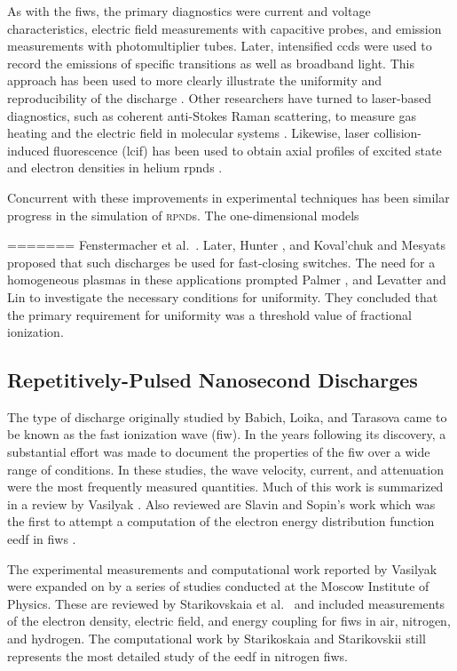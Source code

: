 As with the \acs{fiw}s, the primary diagnostics were current and voltage
characteristics, electric field measurements with capacitive probes, and
emission measurements with photomultiplier tubes. Later, intensified \acs{ccd}s
were used to record the emissions of specific transitions as well as broadband
light. This approach has been used to more clearly illustrate the uniformity and
reproducibility of the discharge \cite{Adamovich2009}. Other researchers have
turned to laser-based diagnostics, such as coherent anti-Stokes Raman
scattering, to measure gas heating \cite{Zuzeek2010} and the electric field in
molecular systems \cite{Ito2010, Ito2010a}. Likewise, laser collision-induced
fluorescence (\acs{lcif}) has been used to obtain axial profiles of excited
state and electron densities in helium \acs{rpnd}s \cite{Weatherford2012}.

Concurrent with these improvements in experimental techniques has been similar
progress in the simulation of \textsc{rpnd}s. The one-dimensional models 

=======
Fenstermacher et al.~\cite{Fenstermacher1972}. Later, Hunter \cite{Hunter1976},
and Koval'chuk and Mesyats \cite{Koval'chuk1976} proposed that such discharges
be used for fast-closing switches. The need for a homogeneous plasmas in these
applications prompted Palmer \cite{Palmer1974}, and Levatter and Lin
\cite{Levatter1980} to investigate the necessary conditions for uniformity. They
concluded that the primary requirement for uniformity was a threshold value of
fractional ionization.

\subsection{Repetitively-Pulsed Nanosecond Discharges}

The type of discharge originally studied by Babich, Loika, and Tarasova came to
be known as the fast ionization wave (\acs{fiw}). In the years following its
discovery, a substantial effort was made to document the properties of the
\acs{fiw} over a wide range of conditions. In these studies, the wave velocity,
current, and attenuation were the most frequently measured quantities. Much of
this work is summarized in a review by Vasilyak \cite{Vasilyak1994}. Also
reviewed are Slavin and Sopin's work which was the first to attempt a
computation of the electron energy distribution function \acs{eedf} in
\acs{fiw}s \cite{Slavin1992}.

The experimental measurements and computational work reported by Vasilyak were
expanded on by a series of studies conducted at the Moscow Institute of Physics.
These are reviewed by Starikovskaia et al.~\cite{Starikovskaia2001} and included
measurements of the electron density, electric field, and energy coupling for
\acs{fiw}s in air, nitrogen, and hydrogen. The computational work by
Starikoskaia and Starikovskii \cite{Starikovskaia2001a} still represents the
most detailed study of the \acs{eedf} in nitrogen \acs{fiw}s.

